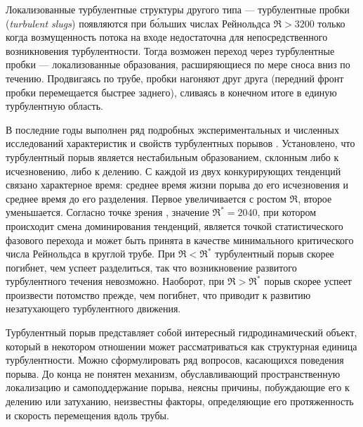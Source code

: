 Локализованные турбулентные структуры другого типа --- турбулентные пробки ({\it turbulent slugs}) появляются при б\'{о}льших числах Рейнольдса $\Re>3200$ только когда возмущенность потока на входе недостаточна для непосредственного возникновения турбулентности. Тогда возможен переход через турбулентные пробки --- локализованные образования, расширяющиеся по мере сноса вниз по течению. Продвигаясь по трубе, пробки нагоняют друг друга (передний фронт пробки перемещается быстрее заднего), сливаясь в конечном итоге в единую турбулентную область.

В последние годы выполнен ряд подробных экспериментальных и численных исследований характеристик и свойств турбулентных порывов \cite{Priymak2004, Peixinho2006, Hof2006finite, Willis2007, Hof2008, Kuik2010, Avila2011}. Установлено, что турбулентный порыв является нестабильным образованием, склонным либо к исчезновению, либо к делению. С каждой из двух конкурирующих тенденций связано характерное время: среднее время жизни порыва до его исчезновения и среднее время до его разделения. Первое увеличивается с ростом $\Re$, второе уменьшается. Согласно точке зрения \cite{Avila2011}, значение $\Re^*=2040$, при котором происходит смена доминирования тенденций, является точкой статистического фазового перехода и может быть принята в качестве минимального критического числа Рейнольдса в круглой трубе. При $\Re<\Re^*$ турбулентный порыв скорее погибнет, чем успеет разделиться, так что возникновение развитого турбулентного течения невозможно. Наоборот, при $\Re>\Re^*$ порыв скорее успеет произвести потомство прежде, чем погибнет, что приводит к развитию незатухающего турбулентного движения.

Турбулентный порыв представляет собой интересный гидродинамический объект, который в некотором отношении может рассматриваться как структурная единица турбулентности. Можно сформулировать ряд вопросов, касающихся поведения порыва. До конца не понятен механизм, обуславливающий пространственную локализацию и самоподдержание порыва, неясны причины, побуждающие его к делению или затуханию, неизвестны факторы, определяющие его протяженность и скорость перемещения вдоль трубы.

